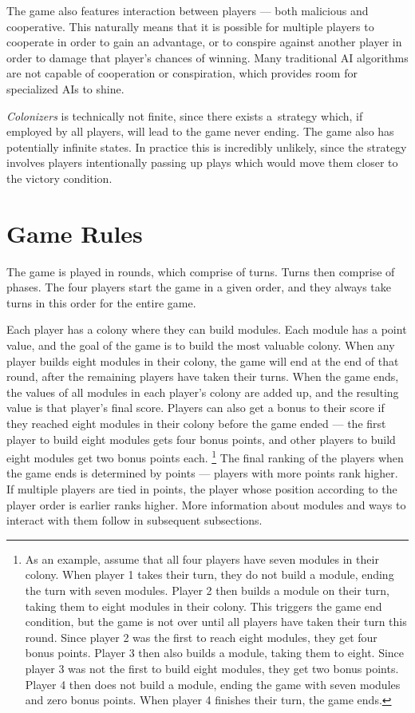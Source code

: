 The game also features interaction between players --- both malicious and cooperative.
This naturally means that it is possible for multiple players to cooperate in order
to gain an advantage, or to conspire against another player in order to damage
that player's chances of winning. Many traditional AI algorithms are not capable
of cooperation or conspiration, which provides room for specialized AIs to shine.

\emph{Colonizers} is technically not finite, since there exists a~strategy which,
if employed by all players, will lead to the game never ending. The game also
has potentially infinite states. In practice this
is incredibly unlikely, since the strategy involves players intentionally
passing up plays which would move them closer to the victory condition.

\section{Game Rules}

The game is played in rounds, which comprise of turns. Turns then comprise of phases.
The four players start the game in a given order, and they always take turns
in this order for the entire game.

Each player has a colony where they can build modules.
Each module has a point value, and the goal of the game is to build the most valuable colony.
When any player builds eight modules in their colony, the game will end at the end
of that round, after the remaining players have taken their turns.
When the game ends, the values of all modules in each player's colony
are added up, and the resulting value is that player's final score. Players can also
get a bonus to their score if they reached eight modules in their colony before
the game ended --- the first player to build eight modules gets four bonus points,
and other players to build eight modules get two bonus points each.
\footnote{As an example, assume that all four players have seven modules in their colony.
When player 1 takes their turn, they do not build a module, ending the turn with seven modules.
Player 2 then builds a module on their turn, taking them to eight modules in their colony.
This triggers the game end condition, but the game is not over until all players have taken
their turn this round. Since player 2 was the first to reach eight modules, they get four
bonus points. Player 3 then also builds a module, taking them to eight. Since player 3
was not the first to build eight modules, they get two bonus points. Player 4 then does
not build a module, ending the game with seven modules and zero bonus points. When player 4
finishes their turn, the game ends.}
The final ranking of the players when the game ends is determined by points --- players
with more points rank higher. If multiple players are tied in points, the player whose
position according to the player order is earlier ranks higher.
More information about modules and ways to interact with them follow in subsequent subsections.

